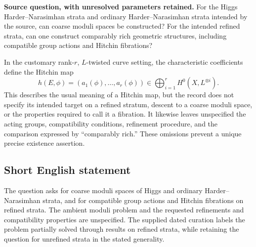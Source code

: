 \documentclass[11pt]{article}
\begin{document}
\textbf{Source question, with unresolved parameters retained.} For the Higgs Harder--Narasimhan strata and ordinary Harder--Narasimhan strata intended by the source, can coarse moduli spaces be constructed? For the intended refined strata, can one construct comparably rich geometric structures, including compatible group actions and Hitchin fibrations?

In the customary rank-\(r\), \(L\)-twisted curve setting, the characteristic coefficients define the Hitchin map
\[
 h(E,\phi)=(a_1(\phi),\ldots,a_r(\phi))
 \in\bigoplus_{i=1}^{r}H^0(X,L^{\otimes i}).
\]
This describes the usual meaning of a Hitchin map, but the record does not specify its intended target on a refined stratum, descent to a coarse moduli space, or the properties required to call it a fibration. It likewise leaves unspecified the acting groups, compatibility conditions, refinement procedure, and the comparison expressed by ``comparably rich.'' These omissions prevent a unique precise existence assertion.
\subsection{Short English statement}
The question asks for coarse moduli spaces of Higgs and ordinary Harder--Narasimhan strata, and for compatible group actions and Hitchin fibrations on refined strata. The ambient moduli problem and the requested refinements and compatibility properties are unspecified. The supplied dated curation labels the problem partially solved through results on refined strata, while retaining the question for unrefined strata in the stated generality.
\end{document}
